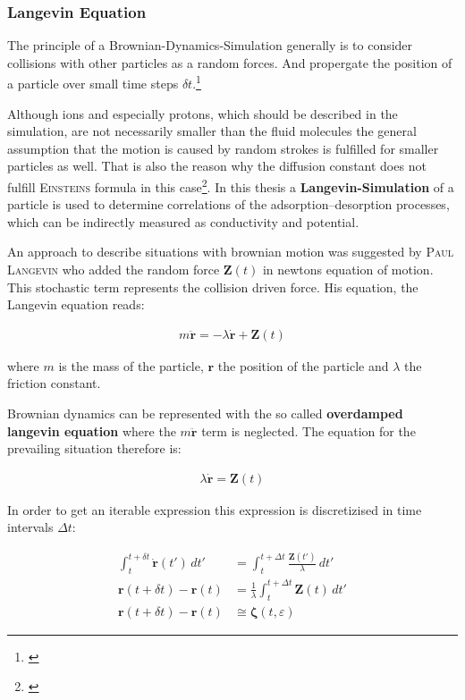\documentclass[a4paper, parskip=half]{scrartcl}
\newcommand{\person}[1]{%
	\textsc{#1}%
}
\newcommand{\effect}[1]{%
	\textbf{#1}%
}
\newcommand{\myCite}[1]{\footnote{\cite{#1} \citeauthor{#1} \citetitle{#1} \citeyear{#1}}}
\begin{document}
\subsubsection{Langevin Equation}
The principle of a Brownian-Dynamics-Simulation generally is to consider collisions with other particles as a random forces. And propergate the position of a particle over small time steps $\delta t$.\myCite{book}

Although ions and especially protons, which should be described in the simulation, are not necessarily smaller than the fluid molecules the general assumption that the motion is caused by random strokes is fulfilled for smaller particles as well. That is also the reason why the diffusion constant does not fulfill \person{Einsteins} formula in this case\myCite{brownian}. In this thesis a \effect{Langevin-Simulation} of a particle is used to determine correlations of the adsorption--desorption processes, which can be indirectly measured as conductivity and potential.
 
An approach to describe situations with brownian motion was suggested by \person{Paul Langevin} who added the random force $\mathbf{Z}(t)$ in newtons equation of motion. This stochastic term represents the collision driven force. His equation, the Langevin equation reads:

\begin{align}
m \ddot{\mathbf{r}} = -\lambda\dot{\mathbf{r}} + \mathbf{Z}(t)
\end{align}

where $m$ is the mass of the particle, $\mathbf{r}$ the position of the particle and $\lambda$ the friction constant.

Brownian dynamics can be represented with the so called \effect{overdamped langevin equation} where the $m \ddot{\mathbf{r}}$ term is neglected. The equation for the prevailing situation therefore is:

\begin{align}
\lambda\dot{\mathbf{r}} = \mathbf{Z}(t)
\end{align}

In order to get an iterable expression this expression is discretizised in time intervals $\Delta t$:

\begin{align}
\int_t^{t+ \delta t} \dot{\mathbf{r}}(t')\, dt' &= \int_t^{t+ \Delta t} \frac{\mathbf{Z}(t')}{\lambda}\, dt' \\
\mathbf{r}(t + \delta t) - \mathbf{r}(t) &= \frac{1}{\lambda} \int_t^{t+ \Delta t} \mathbf{Z}(t)\, dt'\\
\mathbf{r}(t + \delta t) - \mathbf{r}(t) &\cong \boldsymbol{\zeta}(t, \varepsilon)
\end{align}
\end{document}
